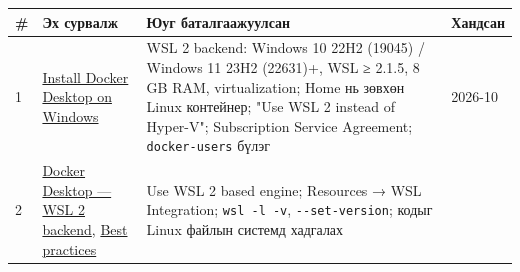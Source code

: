 \begingroup\scriptsize\begin{longtable}[]{@{}llll@{}}
\toprule
\begin{minipage}[b]{0.22\columnwidth}\raggedright
\#\strut
\end{minipage} & \begin{minipage}[b]{0.22\columnwidth}\raggedright
Эх сурвалж\strut
\end{minipage} & \begin{minipage}[b]{0.22\columnwidth}\raggedright
Юуг баталгаажуулсан\strut
\end{minipage} & \begin{minipage}[b]{0.22\columnwidth}\raggedright
Хандсан\strut
\end{minipage}\tabularnewline
\midrule
\endhead
\begin{minipage}[t]{0.22\columnwidth}\raggedright
1\strut
\end{minipage} & \begin{minipage}[t]{0.22\columnwidth}\raggedright
\href{https://docs.docker.com/desktop/setup/install/windows-install/}{Install Docker Desktop on Windows}\strut
\end{minipage} & \begin{minipage}[t]{0.22\columnwidth}\raggedright
WSL 2 backend: Windows 10 22H2 (19045) / Windows 11 23H2 (22631)+, WSL ≥ 2.1.5, 8 GB RAM, virtualization; Home нь зөвхөн Linux контейнер; "Use WSL 2 instead of Hyper-V"; Subscription Service Agreement; \texttt{docker-users} бүлэг\strut
\end{minipage} & \begin{minipage}[t]{0.22\columnwidth}\raggedright
2026-10\strut
\end{minipage}\tabularnewline
\begin{minipage}[t]{0.22\columnwidth}\raggedright
2\strut
\end{minipage} & \begin{minipage}[t]{0.22\columnwidth}\raggedright
\href{https://docs.docker.com/desktop/features/wsl/}{Docker Desktop --- WSL 2 backend}, \href{https://docs.docker.com/desktop/features/wsl/best-practices/}{Best practices}\strut
\end{minipage} & \begin{minipage}[t]{0.22\columnwidth}\raggedright
Use WSL 2 based engine; Resources → WSL Integration; \texttt{wsl\ -l\ -v}, \texttt{-\/-set-version}; кодыг Linux файлын системд хадгалах\strut
\end{minipage} & \begin{minipage}[t]{0.22\columnwidth}\raggedright

\end{minipage}
\end{longtable}
